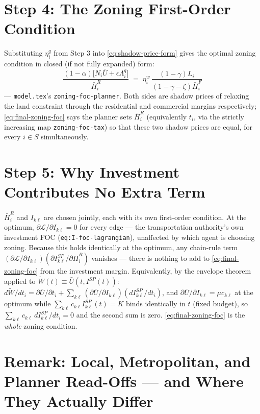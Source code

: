 \documentclass[12pt, a4paper]{article}
\theoremstyle{definition}
\begin{document}
\section*{Step 4: The Zoning First-Order Condition}

Substituting $\eta_i^q$ from Step 3 into \eqref{eq:shadow-price-form} gives the optimal zoning condition in closed (if not fully expanded) form:
\begin{equation}
\boxed{\;\frac{(1-\alpha)\bigl[N_i\bar U+\epsilon\Lambda_i^q\bigr]}{\bar H_i^R} \;=\; \eta_i^w\,\frac{(1-\gamma)L_i}{(1-\gamma-\zeta)\bar H_i^F}\;} \label{eq:final-zoning-foc}
\end{equation}
— \texttt{model.tex}'s \texttt{zoning-foc-planner}. Both sides are shadow prices of relaxing the land constraint through the residential and commercial margins respectively; \eqref{eq:final-zoning-foc} says the planner sets $\bar H_i^R$ (equivalently $t_i$, via the strictly increasing map \texttt{zoning-foc-tax}) so that these two shadow prices are equal, for every $i\in S$ simultaneously.

\section*{Step 5: Why Investment Contributes No Extra Term}

$\bar H_i^R$ and $I_{k\ell}$ are chosen jointly, each with its own first-order condition. At the optimum, $\partial\mathcal L/\partial I_{k\ell}=0$ for every edge — the transportation authority's own investment FOC (\texttt{eq:I-foc-lagrangian}), unaffected by which agent is choosing zoning. Because this holds identically at the optimum, any chain-rule term $(\partial\mathcal L/\partial I_{k\ell})(\partial I_{k\ell}^{SP}/\partial \bar H_i^R)$ vanishes — there is nothing to add to \eqref{eq:final-zoning-foc} from the investment margin. Equivalently, by the envelope theorem applied to $\tilde W(t)\equiv \bar U(t,I^{SP}(t))$: $d\tilde W/dt_i = \partial \bar U/\partial t_i + \sum_{k\ell}(\partial \bar U/\partial I_{k\ell})(dI_{k\ell}^{SP}/dt_i)$, and $\partial \bar U/\partial I_{k\ell}=\mu c_{k\ell}$ at the optimum while $\sum_{k\ell}c_{k\ell}I_{k\ell}^{SP}(t)=K$ binds identically in $t$ (fixed budget), so $\sum_{k\ell}c_{k\ell}\,dI_{k\ell}^{SP}/dt_i=0$ and the second sum is zero. \eqref{eq:final-zoning-foc} is the \emph{whole} zoning condition.

\section*{Remark: Local, Metropolitan, and Planner Read-Offs — and Where They Actually Differ}
\end{document}
